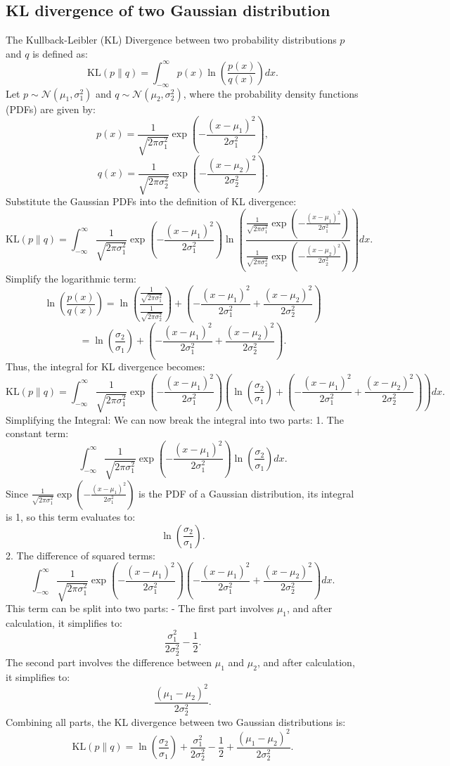 \subsection{KL divergence of two Gaussian distribution}
\label{GaussianKL}
The Kullback-Leibler (KL) Divergence between two probability distributions \(p\) and \(q\) is defined as:
\[
\text{KL}(p \| q) = \int_{-\infty}^{\infty} p(x) \ln \left( \frac{p(x)}{q(x)} \right) dx.
\]
 Let \( p \sim \mathcal{N}(\mu_1, \sigma_1^2) \) and \( q \sim \mathcal{N}(\mu_2, \sigma_2^2) \), where the probability density functions (PDFs) are given by:
\[
p(x) = \frac{1}{\sqrt{2\pi \sigma_1^2}} \exp \left( -\frac{(x - \mu_1)^2}{2 \sigma_1^2} \right),
\]
\[
q(x) = \frac{1}{\sqrt{2\pi \sigma_2^2}} \exp \left( -\frac{(x - \mu_2)^2}{2 \sigma_2^2} \right).
\]
Substitute the Gaussian PDFs into the definition of KL divergence:
\[
\text{KL}(p \| q) = \int_{-\infty}^{\infty} \frac{1}{\sqrt{2\pi \sigma_1^2}} \exp \left( -\frac{(x - \mu_1)^2}{2 \sigma_1^2} \right) \ln \left( \frac{\frac{1}{\sqrt{2\pi \sigma_1^2}} \exp \left( -\frac{(x - \mu_1)^2}{2 \sigma_1^2} \right)}{\frac{1}{\sqrt{2\pi \sigma_2^2}} \exp \left( -\frac{(x - \mu_2)^2}{2 \sigma_2^2} \right)} \right) dx.
\]
Simplify the logarithmic term:
\[
\ln \left( \frac{p(x)}{q(x)} \right) = \ln \left( \frac{\frac{1}{\sqrt{2\pi \sigma_1^2}}}{\frac{1}{\sqrt{2\pi \sigma_2^2}}} \right) + \left( -\frac{(x - \mu_1)^2}{2 \sigma_1^2} + \frac{(x - \mu_2)^2}{2 \sigma_2^2} \right)
\]
\[
= \ln \left( \frac{\sigma_2}{\sigma_1} \right) + \left( -\frac{(x - \mu_1)^2}{2 \sigma_1^2} + \frac{(x - \mu_2)^2}{2 \sigma_2^2} \right).
\]
Thus, the integral for KL divergence becomes:
\[
\text{KL}(p \| q) = \int_{-\infty}^{\infty} \frac{1}{\sqrt{2\pi \sigma_1^2}} \exp \left( -\frac{(x - \mu_1)^2}{2 \sigma_1^2} \right) \left( \ln \left( \frac{\sigma_2}{\sigma_1} \right) + \left( -\frac{(x - \mu_1)^2}{2 \sigma_1^2} + \frac{(x - \mu_2)^2}{2 \sigma_2^2} \right) \right) dx.
\]
Simplifying the Integral: We can now break the integral into two parts:
1. The constant term:
\[
\int_{-\infty}^{\infty} \frac{1}{\sqrt{2\pi \sigma_1^2}} \exp \left( -\frac{(x - \mu_1)^2}{2 \sigma_1^2} \right) \ln \left( \frac{\sigma_2}{\sigma_1} \right) dx.
\]
Since \( \frac{1}{\sqrt{2\pi \sigma_1^2}} \exp \left( -\frac{(x - \mu_1)^2}{2 \sigma_1^2} \right) \) is the PDF of a Gaussian distribution, its integral is 1, so this term evaluates to:
\[
\ln \left( \frac{\sigma_2}{\sigma_1} \right).
\]
2. The difference of squared terms:
\[
\int_{-\infty}^{\infty} \frac{1}{\sqrt{2\pi \sigma_1^2}} \exp \left( -\frac{(x - \mu_1)^2}{2 \sigma_1^2} \right) \left( -\frac{(x - \mu_1)^2}{2 \sigma_1^2} + \frac{(x - \mu_2)^2}{2 \sigma_2^2} \right) dx.
\]
This term can be split into two parts:
- The first part involves \( \mu_1 \), and after calculation, it simplifies to:
\[
\frac{\sigma_1^2}{2 \sigma_2^2} - \frac{1}{2}.
\]
The second part involves the difference between \( \mu_1 \) and \( \mu_2 \), and after calculation, it simplifies to:
\[
\frac{(\mu_1 - \mu_2)^2}{2 \sigma_2^2}.
\]
Combining all parts, the KL divergence between two Gaussian distributions is:
\[
\text{KL}(p \| q) = \ln \left( \frac{\sigma_2}{\sigma_1} \right) + \frac{\sigma_1^2}{2 \sigma_2^2} - \frac{1}{2} + \frac{(\mu_1 - \mu_2)^2}{2 \sigma_2^2}.
\]


